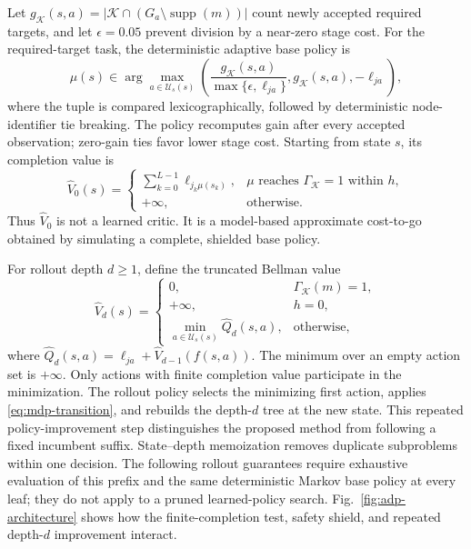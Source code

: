 \documentclass{IEEEtaes}
\theoremstyle{remark}
\theoremstyle{plain}
\begin{document}
Let $g_{\mathcal K}(s,a)=|\mathcal K\cap(G_a\setminus\operatorname{supp}(m))|$ count newly accepted required targets, and let $\epsilon=0.05$ prevent division by a near-zero stage cost. For the required-target task, the deterministic adaptive base policy is
\begin{equation}
  \mu(s)\in\arg\max_{a\in\mathcal U_s(s)}
  \left(\frac{g_{\mathcal K}(s,a)}{\max\{\epsilon,\ell_{ja}\}},
  g_{\mathcal K}(s,a),-\ell_{ja}\right),
  \label{eq:base-policy}
\end{equation}
where the tuple is compared lexicographically, followed by deterministic node-identifier tie breaking. The policy recomputes gain after every accepted observation; zero-gain ties favor lower stage cost. Starting from state $s$, its completion value is
\begin{equation}
  \widehat V_0(s)=
  \begin{cases}
  \sum_{k=0}^{L-1}\ell_{j_k\mu(s_k)}, & \mu\text{ reaches }\Gamma_{\mathcal K}=1\text{ within }h,\\
  +\infty, & \text{otherwise}.
  \end{cases}
  \label{eq:base-value}
\end{equation}
Thus $\widehat V_0$ is not a learned critic. It is a model-based approximate cost-to-go obtained by simulating a complete, shielded base policy.

For rollout depth $d\ge1$, define the truncated Bellman value
\begin{equation}
  \widehat V_d(s)=
  \begin{cases}
    0, & \Gamma_{\mathcal K}(m)=1,\\
    +\infty, & h=0,\\
    \min\limits_{a\in\mathcal U_s(s)}\widehat Q_d(s,a), & \text{otherwise},
  \end{cases}
  \label{eq:rollout-value}
\end{equation}
where $\widehat Q_d(s,a)=\ell_{ja}+\widehat V_{d-1}(f(s,a))$.
The minimum over an empty action set is $+\infty$. Only actions with finite completion value participate in the minimization. The rollout policy selects the minimizing first action, applies \eqref{eq:mdp-transition}, and rebuilds the depth-$d$ tree at the new state. This repeated policy-improvement step distinguishes the proposed method from following a fixed incumbent suffix. State--depth memoization removes duplicate subproblems within one decision. The following rollout guarantees require exhaustive evaluation of this prefix and the same deterministic Markov base policy at every leaf; they do not apply to a pruned learned-policy search.
Fig.~\ref{fig:adp-architecture} shows how the finite-completion test, safety shield, and repeated depth-$d$ improvement interact.
\end{document}
